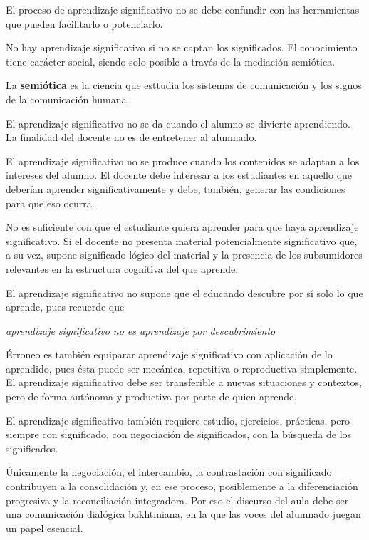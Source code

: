 \documentclass[12pt]{report}
\newcounter{it}
\theoremstyle{largebreak}
\begin{document}
    El proceso de aprendizaje significativo no se debe confundir con las herramientas que pueden facilitarlo o potenciarlo.

    No hay aprendizaje significativo si no se captan los significados. El conocimiento tiene carácter social, siendo solo posible a través de la mediación semiótica.

    \begin{mydef}
        La \textbf{semiótica} es la ciencia que esttudia los sistemas de comunicación y los signos de la comunicación humana.
    \end{mydef}

    El aprendizaje significativo no se da cuando el alumno se divierte aprendiendo. La finalidad del docente no es de entretener al alumnado.

    El aprendizaje significativo no se produce cuando los contenidos se adaptan a los intereses del alumno. El docente debe interesar a los estudiantes en aquello que deberían aprender significativamente y debe, también, generar las condiciones para que eso ocurra.

    No es suficiente con que el estudiante quiera aprender para que haya aprendizaje significativo. Si el docente no presenta material potencialmente significativo que, a su vez, supone significado lógico del material y la presencia de los subsumidores relevantes en la estructura cognitiva del que aprende.

    El aprendizaje significativo no supone que el educando descubre por sí solo lo que aprende, pues recuerde que
    \begin{center}
        \textit{aprendizaje significativo no es aprendizaje por descubrimiento}
    \end{center}

    Érroneo es también equiparar aprendizaje significativo con aplicación de lo aprendido, pues ésta puede ser mecánica, repetitiva o reproductiva simplemente. El aprendizaje significativo debe ser transferible a nuevas situaciones y contextos, pero de forma autónoma y productiva por parte de quien aprende.

    El aprendizaje significativo también requiere estudio, ejercicios, prácticas, pero siempre con significado, con negociación de significados, con la búsqueda de los significados.

    Únicamente la negociación, el intercambio, la
    contrastación con significado contribuyen a la consolidación y, en ese proceso, posiblemente a la diferenciación progresiva y la reconciliación integradora. Por eso el discurso del aula debe ser una comunicación dialógica bakhtiniana, en la que las voces del alumnado juegan un papel esencial.
\end{document}
